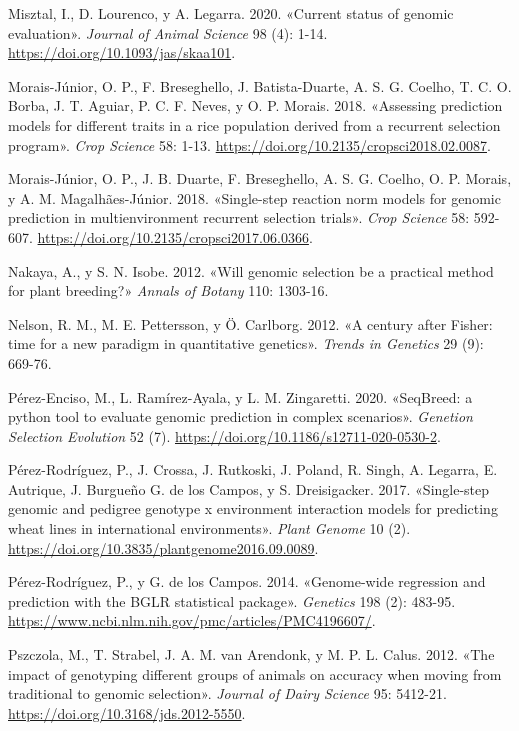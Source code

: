 \documentclass[11pt,spanish,a4paper,oneside,]{book} %
\begin{document}
\leavevmode\hypertarget{ref-cite:18}{}%
Misztal, I., D. Lourenco, y A. Legarra. 2020. «Current status of genomic evaluation». \emph{Journal of Animal Science} 98 (4): 1-14. \url{https://doi.org/10.1093/jas/skaa101}.

\leavevmode\hypertarget{ref-cite:68}{}%
Morais-Júnior, O. P., F. Breseghello, J. Batista-Duarte, A. S. G. Coelho, T. C. O. Borba, J. T. Aguiar, P. C. F. Neves, y O. P. Morais. 2018. «Assessing prediction models for different traits in a rice population derived from a recurrent selection program». \emph{Crop Science} 58: 1-13. \url{https://doi.org/10.2135/cropsci2018.02.0087}.

\leavevmode\hypertarget{ref-cite:69}{}%
Morais-Júnior, O. P., J. B. Duarte, F. Breseghello, A. S. G. Coelho, O. P. Morais, y A. M. Magalhães-Júnior. 2018. «Single-step reaction norm models for genomic prediction in multienvironment recurrent selection trials». \emph{Crop Science} 58: 592-607. \url{https://doi.org/10.2135/cropsci2017.06.0366}.

\leavevmode\hypertarget{ref-cite:6}{}%
Nakaya, A., y S. N. Isobe. 2012. «Will genomic selection be a practical method for plant breeding?» \emph{Annals of Botany} 110: 1303-16.

\leavevmode\hypertarget{ref-cite:2}{}%
Nelson, R. M., M. E. Pettersson, y Ö. Carlborg. 2012. «A century after Fisher: time for a new paradigm in quantitative genetics». \emph{Trends in Genetics} 29 (9): 669-76.

\leavevmode\hypertarget{ref-cite:47}{}%
Pérez-Enciso, M., L. Ramírez-Ayala, y L. M. Zingaretti. 2020. «SeqBreed: a python tool to evaluate genomic prediction in complex scenarios». \emph{Genetion Selection Evolution} 52 (7). \url{https://doi.org/10.1186/s12711-020-0530-2}.

\leavevmode\hypertarget{ref-cite:19}{}%
Pérez-Rodríguez, P., J. Crossa, J. Rutkoski, J. Poland, R. Singh, A. Legarra, E. Autrique, J. Burgueño G. de los Campos, y S. Dreisigacker. 2017. «Single-step genomic and pedigree genotype x environment interaction models for predicting wheat lines in international environments». \emph{Plant Genome} 10 (2). \url{https://doi.org/10.3835/plantgenome2016.09.0089}.

\leavevmode\hypertarget{ref-cite:50}{}%
Pérez-Rodríguez, P., y G. de los Campos. 2014. «Genome-wide regression and prediction with the BGLR statistical package». \emph{Genetics} 198 (2): 483-95. \url{https://www.ncbi.nlm.nih.gov/pmc/articles/PMC4196607/}.

\leavevmode\hypertarget{ref-cite:74}{}%
Pszczola, M., T. Strabel, J. A. M. van Arendonk, y M. P. L. Calus. 2012. «The impact of genotyping different groups of animals on accuracy when moving from traditional to genomic selection». \emph{Journal of Dairy Science} 95: 5412-21. \url{https://doi.org/10.3168/jds.2012-5550}.
\end{document}
